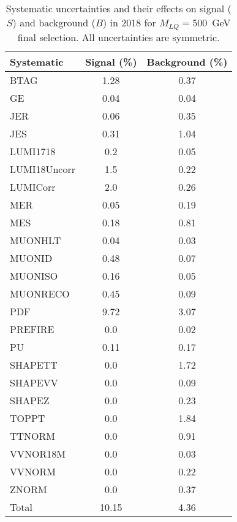 \begin{table}[htbp]
\begin{center}
\caption{Systematic uncertainties and their effects on signal ($S$) and background ($B$) in 2018 for $M_{LQ}=500$~GeV final selection. All uncertainties are symmetric.}
\begin{tabular}{lcc}
\hline\hline
Systematic & Signal (\%) & Background (\%) \\ \hline 
BTAG & 1.28 & 0.37\\ 
GE & 0.04 & 0.04\\ 
JER & 0.06 & 0.35\\ 
JES & 0.31 & 1.04\\ 
LUMI1718 & 0.2 & 0.05\\ 
LUMI18Uncorr & 1.5 & 0.22\\ 
LUMICorr & 2.0 & 0.26\\ 
MER & 0.05 & 0.19\\ 
MES & 0.18 & 0.81\\ 
MUONHLT & 0.04 & 0.03\\ 
MUONID & 0.48 & 0.07\\ 
MUONISO & 0.16 & 0.05\\ 
MUONRECO & 0.45 & 0.09\\ 
PDF & 9.72 & 3.07\\ 
PREFIRE & 0.0 & 0.02\\ 
PU & 0.11 & 0.17\\ 
SHAPETT & 0.0 & 1.72\\ 
SHAPEVV & 0.0 & 0.09\\ 
SHAPEZ & 0.0 & 0.23\\ 
TOPPT & 0.0 & 1.84\\ 
TTNORM & 0.0 & 0.91\\ 
VVNOR18M & 0.0 & 0.03\\ 
VVNORM & 0.0 & 0.22\\ 
ZNORM & 0.0 & 0.37\\ 
Total & 10.15 & 4.36\\ \hline \hline
\end{tabular}
\label{tab:SysUncertainties_uujj_500}
\end{center}
\end{table}

